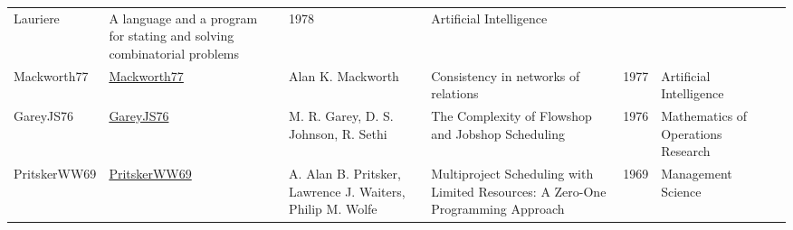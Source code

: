 {\begin{longtable}{p{2cm}p{2cm}p{5cm}p{10cm}rp{3cm}l}
Lauriere & A language and a program for stating and solving combinatorial problems & 1978 & Artificial Intelligence & \cite{Lauriere78}\\Mackworth77 & \href{http://dx.doi.org/10.1016/0004-3702(77)90007-8}{Mackworth77} & Alan K. Mackworth & Consistency in networks of relations & 1977 & Artificial Intelligence & \cite{Mackworth77}\\GareyJS76 & \href{http://dx.doi.org/10.1287/moor.1.2.117}{GareyJS76} & M. R. Garey, D. S. Johnson, R. Sethi & The Complexity of Flowshop and Jobshop Scheduling & 1976 & Mathematics of Operations Research & \cite{GareyJS76}\\PritskerWW69 & \href{http://dx.doi.org/10.1287/mnsc.16.1.93}{PritskerWW69} & A. Alan B. Pritsker, Lawrence J. Waiters, Philip M. Wolfe & Multiproject Scheduling with Limited Resources: A Zero-One Programming Approach & 1969 & Management Science & \cite{PritskerWW69}\\\end{longtable}
}

